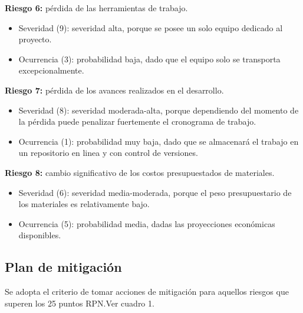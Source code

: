\documentclass[
11pt, %
codirector, %
]{charter}
\begin{document}
\textbf{Riesgo 6:} pérdida de las herramientas de trabajo.
		\begin{itemize}
			\item Severidad (9): severidad alta, porque se posee un solo equipo dedicado al proyecto.
			\item Ocurrencia (3): probabilidad baja, dado que el equipo solo se transporta excepcionalmente.
		\end{itemize}   
\textbf{Riesgo 7:} pérdida de los avances realizados en el desarrollo.
		\begin{itemize}
			\item Severidad (8): severidad moderada-alta, porque dependiendo del momento de la pérdida puede penalizar fuertemente el cronograma de trabajo.
			\item Ocurrencia (1): probabilidad muy baja, dado que se almacenará el trabajo en un repositorio en linea y con control de versiones.
		\end{itemize}   
\textbf{Riesgo 8:} cambio significativo de los costos presupuestados de materiales.
		\begin{itemize}
			\item Severidad (6): severidad media-moderada, porque el peso presupuestario de los materiales es relativamente bajo.
			\item Ocurrencia (5): probabilidad media, dadas las proyecciones económicas disponibles.
		\end{itemize}   

\subsection*{Plan de mitigación}

Se adopta el criterio de tomar acciones de mitigación para aquellos riesgos que superen los 25 puntos RPN.Ver cuadro 1.
 
\end{document}
